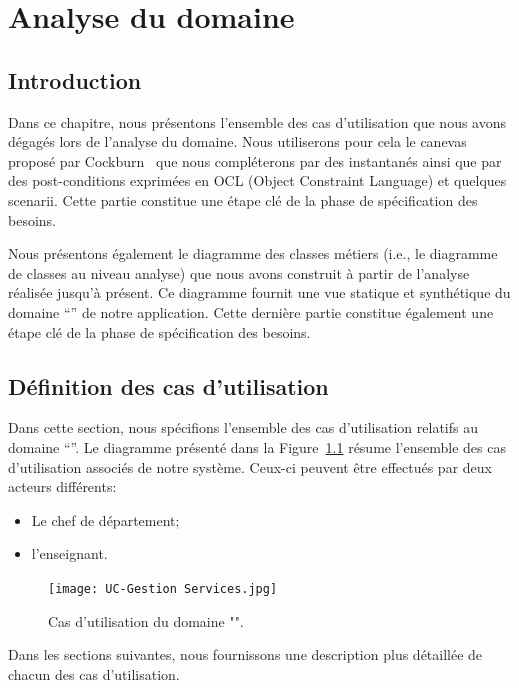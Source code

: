 
\chapter{Analyse du domaine}\label{chapter:analyse}
\section{Introduction}

Dans ce chapitre, nous présentons l'ensemble des cas d'utilisation que nous avons dégagés lors de l'analyse du domaine. Nous utiliserons pour cela le canevas proposé par Cockburn~\cite{Cockburn:2000} que nous compléterons par des instantanés ainsi que par des post-conditions exprimées en OCL (Object Constraint Language) et quelques scenarii. Cette partie constitue une étape clé de la phase de spécification des besoins. 

Nous présentons également le diagramme des classes métiers (i.e., le diagramme de classes au niveau analyse) que nous avons construit à partir de l'analyse réalisée jusqu'à présent. 
Ce diagramme fournit une vue statique et synthétique du domaine ``\projet'' de notre application. 
Cette dernière partie constitue également une étape clé de la phase de spécification des besoins.


\section{Définition des cas d'utilisation}
Dans cette section, nous spécifions  l'ensemble des cas d'utilisation relatifs au domaine ``\projet''. Le diagramme présenté dans la Figure~\ref{fig:usecases} résume l'ensemble des cas d'utilisation associés de notre système. Ceux-ci peuvent être effectués par deux acteurs différents:
 \begin{itemize}
 \item Le chef de département;
 \item l'enseignant.
 \end{itemize}

\begin{figure}[h!]
	\centering
		\texttt{[image: UC-Gestion Services.jpg]}
	\caption{Cas d'utilisation du domaine "\projet".}
	 \label{fig:usecases}
\end{figure}

Dans les sections suivantes, nous fournissons une description plus détaillée de chacun des cas d'utilisation.


